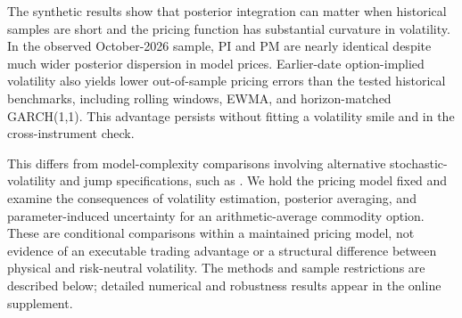 The synthetic results show that posterior integration can matter when historical samples are short and the pricing function has substantial curvature in volatility. In the observed October-2026 sample, PI and PM are nearly identical despite much wider posterior dispersion in model prices. Earlier-date option-implied volatility also yields lower out-of-sample pricing errors than the tested historical benchmarks, including rolling windows, EWMA, and horizon-matched GARCH(1,1). This advantage persists without fitting a volatility smile and in the cross-instrument check.

This differs from model-complexity comparisons involving alternative stochastic-volatility and jump specifications, such as \citet{cumminsesposito2025}. We hold the pricing model fixed and examine the consequences of volatility estimation, posterior averaging, and parameter-induced uncertainty for an arithmetic-average commodity option. These are conditional comparisons within a maintained pricing model, not evidence of an executable trading advantage or a structural difference between physical and risk-neutral volatility. The methods and sample restrictions are described below; detailed numerical and robustness results appear in the online supplement.
